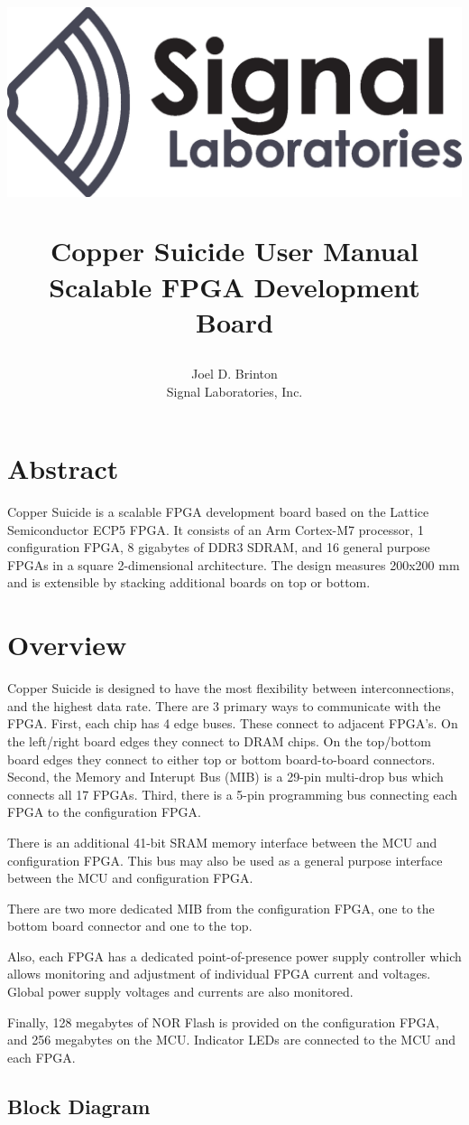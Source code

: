 \documentclass{article}
\title{\begin{center}
\includegraphics[scale=0.5]{logo2-normal-draft.eps}
\end{center}
Copper Suicide\textsuperscript{\texttrademark} User Manual\\
Scalable FPGA Development Board\\
\author{Joel D. Brinton\\Signal Laboratories, Inc.}}
\begin{document}
\maketitle
\section{Abstract}

Copper Suicide is a scalable FPGA development board based on the Lattice Semiconductor ECP5 FPGA. It consists of an Arm Cortex-M7 processor, 1 configuration FPGA, 8 gigabytes of DDR3 SDRAM, and 16 general purpose FPGAs in a square 2-dimensional architecture. The design measures 200x200 mm and is extensible by stacking additional boards on top or bottom.

\newpage

\section{Overview}

Copper Suicide is designed to have the most flexibility between interconnections, and the highest data rate. There are 3 primary ways to communicate with the FPGA. First, each chip has 4 edge buses. These connect to adjacent FPGA's. On the left/right board edges they connect to DRAM chips. On the top/bottom board edges they connect to  either top or bottom board-to-board connectors. Second, the Memory and Interupt Bus (MIB) is a 29-pin multi-drop bus which connects all 17 FPGAs. Third, there is a 5-pin programming bus connecting each FPGA to the configuration FPGA.

There is an additional 41-bit SRAM memory interface between the MCU and configuration FPGA. This bus may also be used as a general purpose interface between the MCU and configuration FPGA.

There are two more dedicated MIB from the configuration FPGA, one to the bottom board connector and one to the top.

Also, each FPGA has a dedicated point-of-presence power supply controller which allows monitoring and adjustment of individual FPGA current and voltages. Global power supply voltages and currents are also monitored.

Finally, 128 megabytes of NOR Flash is provided on the configuration FPGA, and 256 megabytes on the MCU. Indicator LEDs are connected to the MCU and each FPGA.


\subsection{Block Diagram}
\end{document}
